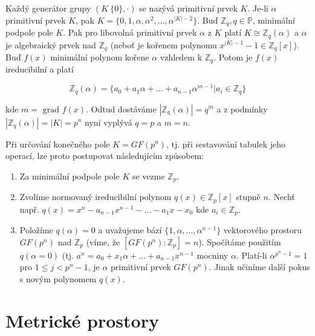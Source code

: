 \documentclass[a4paper, 11pt]{report}
\begin{document}
Každý generátor grupy $(K \ \{0\}, \cdot)$ se nazývá primitivní prvek $K$. Je-li $\alpha$ primitivní prvek $K$, pak $K = \{0, 1, \alpha, \alpha^2, \dots, \alpha^{|K|-2}\}$. Buď $\mathbb{Z}_q, q \in \mathbb{P}$, minimální podpole pole $K$. Pak pro libovolná primitivní prvek $\alpha$ z $K$ platí $K \cong \mathbb{Z}_q(\alpha)$ a $\alpha$ je algebraický prvek nad $\mathbb{Z}_q$ (neboť je kořenem polynomu $x^{|K|-1} - 1 \in \mathbb{Z}_q[x]$). Buď $f(x)$ minimální polynom kořene $\alpha$ vzhledem k $\mathbb{Z}_q$. Potom je $f(x)$ ireducibilní a platí

$$ \mathbb{Z}_q(\alpha) = \{a_0 + a_1 \alpha + \dots + a_{n-1}\alpha^{m-1} | a_i \in \mathbb{Z}_q\}$$

kde $m = \text{ grad } f(x)$. Odtud dostáváme $|\mathbb{Z_q}(\alpha)| = q^m$ a z podmínky $|\mathbb{Z}_q(\alpha)| = |K| = p^n$ nyní vyplývá $q = p$ a $m = n$.

Při určování konečného pole $K = GF(p^n)$, tj. při sestavování tabulek jeho operací, lze proto postupovat následujícím způsobem:
\begin{enumerate}
	\item Za minimální podpole pole $K$ se vezme $\mathbb{Z}_p$.
	\item Zvolíme normovaný ireducibilní polynom $q(x) \in \mathbb{Z}_p[x]$ stupně $n$. Nechť např. $q(x) = x^n - a_{n-1}x^{n-1} - \dots - a_1 x - x_0$ kde $a_i \in \mathbb{Z}_p$.
	\item Položíme $q(\alpha) = 0$ a uvažujeme bází $\{1, \alpha, \dots, \alpha^{n-1}\}$ vektorového prostoru $GF(p^n)$ nad $\mathbb{Z}_p$ (víme, že $[GF(p^n): \mathbb{Z}_p] = n$). Spočítáme použitím $q(\alpha = 0)$ (tj. $a^n = a_0 + x_1 \alpha + \dots + a_{n-1}x^{n-1}$ mocniny $\alpha$. Platí-li $\alpha^{p^n-1} = 1$ pro $1 \leq j < p^n - 1$, je $\alpha$ primitivní prvek $GF(p^n)$. Jinak učiníme další pokus s novým polynomem $q(x)$.
\end{enumerate}













\chapter{Metrické prostory} \label{cha:12}
\end{document}
